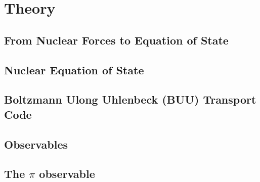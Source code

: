 \chapter{Theory}
\section{From Nuclear Forces to Equation of State}
\section{Nuclear Equation of State}
\section{Boltzmann Ulong Uhlenbeck (BUU) Transport Code}
\section{Observables}
\section{The $\pi$ observable}